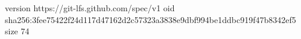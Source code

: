 version https://git-lfs.github.com/spec/v1
oid sha256:3fee75422f24d117d47162d2c57323a3838e9dbf994be1ddbc919f47b8342ef5
size 74
